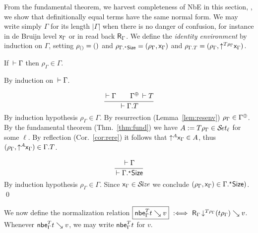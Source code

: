 \documentclass[acmlarge,review,anonymous]{acmart}\settopmatter{printfolios=true}
\makeatletter
\newenvironment{proof*}[1][\proofname]{\par
  \normalfont \topsep6\p@\@plus6\p@\relax
  \trivlist
  \item[\@proofindent\hskip\labelsep
        {\@proofnamefont #1\@addpunct{.}}]\ignorespaces
}{%
  \endtrivlist\@endpefalse
}
\makeatother
\begin{document}
From the fundamental theorem, we harvest completeness of NbE in this
section, \ie, we show that definitionally equal terms have the same
normal form.
We may write simply $\Gamma$ for its length $|\Gamma|$ when there is no
danger of confusion, for instance in de Bruijn level $\var\Gamma$ or
in read back $\tR_{\Gamma}$.
We define the \emph{identity environment} \fbox{$\rho_\Gamma$} by induction on $\Gamma$,
setting $\rho_{\cempty} = \sempty$ and
$\rho_{\eext \Gamma \Size} = (\rho_\Gamma, \var\Gamma)$ and
$\rho_{\cext \Gamma T} = (\rho_\Gamma, \up{T\rho_\Gamma} \var\Gamma)$.
\begin{lemma}
  If\/ $\der \Gamma$ then
  $\rho_\Gamma \in \Gamma$.
\end{lemma}
\begin{proof*}
By induction on $\der \Gamma$.
\begin{caselist}

\nextcase
\vspace{-3ex}
\[
  \ru{\der \Gamma \qquad \resurrect\Gamma \der T
    }{\der \cext\Gamma T}
\]
By induction hypothesis $\rho_\Gamma \in \Gamma$.
By resurrection (Lemma~\ref{lem:resenv}) $\rho_\Gamma \in \resurrect\Gamma$.
By the fundamental theorem (Thm.~\ref{thm:fund}) we have $A := T\rho_\Gamma \in \SET[\ell]$ for some $\ell$.
By reflection (Cor.~\ref{cor:rere}) it follows that $\up A \var\Gamma \in A$, thus
$(\rho_\Gamma, \up A \var\Gamma) \in \cext \Gamma T$.

\nextcase
\vspace{-3ex}
\[
  \ru{\der \Gamma
    }{\der \eext\Gamma \Size}
\]
By induction hypothesis $\rho_\Gamma \in \Gamma$.  Since $\var\Gamma \in \SIZE$ we conclude
$(\rho_\Gamma, \var\Gamma) \in \eext\Gamma \Size)$.
\qed
\end{caselist}
\end{proof*}

We now define the normalization relation
$\fbox{$\nbe \Gamma T t \evalsto v$} \defas \R {\Gamma} {\down{T \rho_\Gamma} (t \rho_\Gamma)} v$.
Whenever $\nbe \Gamma T t \evalsto v$, we may write $\nbe \Gamma T t$ for $v$.
\end{document}

